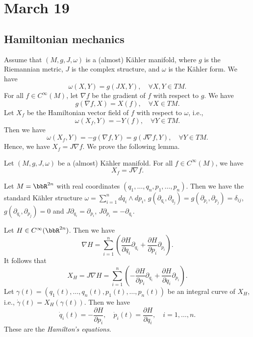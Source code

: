 \section{March 19}


\subsection{Hamiltonian mechanics}

  Assume that $(M,g,J,\omega)$ is a (almost) K\"ahler manifold, where $g$ is the Riemannian metric, $J$ is the complex structure, and $\omega$ is the K\"ahler form.
  We have 
  \[ \omega(X,Y) = g(JX,Y), \quad \forall X,Y \in TM. \]
  For all $f \in C^\infty(M)$, let $\nabla f$ be the gradient of $f$ with respect to $g$.
  We have 
  \[ g \left( \nabla f, X \right) = X(f), \quad \forall X \in TM. \]
  Let $X_f$ be the Hamiltonian vector field of $f$ with respect to $\omega$, i.e.,
  \[ \omega(X_f, Y) = -Y(f), \quad \forall Y \in TM. \]
  Then we have
  \[ \omega(X_f, Y) = -g(\nabla f, Y) = g(J \nabla f, Y), \quad \forall Y \in TM. \] 
  Hence, we have $X_f = J \nabla f$.
  We prove the following lemma.

  \begin{lemma}
    Let $(M,g,J,\omega)$ be a (almost) K\"ahler manifold. 
    For all $f \in C^\infty(M)$, we have
    \[ X_f = J \nabla f. \]
  \end{lemma}

  \begin{example}
    Let $M = \bbR^{2n}$ with  real coordinates $(q_1, \ldots, q_n, p_1, \ldots, p_n)$.
    Then we have the standard K\"ahler structure $\omega = \sum_{i=1}^n dq_i \wedge dp_i$, $g(\partial_{q_i}, \partial_{q_j}) = g(\partial_{p_i}, \partial_{p_j}) = \delta_{ij}$, $g(\partial_{q_i}, \partial_{p_j}) = 0$ and $J \partial_{q_i} = \partial_{p_i}$, $J \partial_{p_i} = -\partial_{q_i}$.
    
    Let $H \in C^\infty(\bbR^{2n})$.
    Then we have
    \[ \nabla H = \sum_{i=1}^n \left( \frac{\partial H}{\partial q_i} \partial_{q_i} + \frac{\partial H}{\partial p_i} \partial_{p_i} \right). \]
    It follows that
    \[ X_H = J \nabla H = \sum_{i=1}^n \left( - \frac{\partial H}{\partial p_i} \partial_{q_i} + \frac{\partial H}{\partial q_i} \partial_{p_i} \right). \]
    Let $\gamma(t) = (q_1(t), \ldots, q_n(t), p_1(t), \ldots, p_n(t))$ be an integral curve of $X_H$, i.e., $\dot{\gamma}(t) = X_H(\gamma(t))$.
    Then we have
    \[ \dot{q}_i(t) = -\frac{\partial H}{\partial p_i}, \quad \dot{p}_i(t) = \frac{\partial H}{\partial q_i}, \quad i = 1, \ldots, n. \]
    These are the \emph{Hamilton's equations}.
  \end{example}

